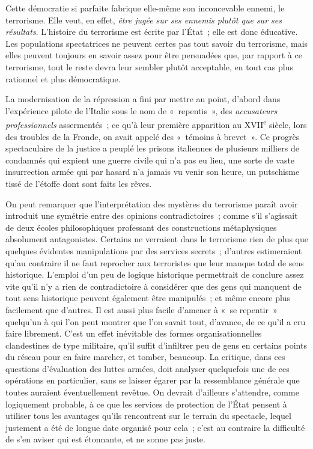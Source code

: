 \documentclass[french,twoside]{book} %
\def\mednobreak{\ifdim\lastskip<\medskipamount
  \removelastskip\nopagebreak\medskip\fi}
\newcommand{\labelblock}[1]{\medbreak{\noindent\color{rubric}\bfseries #1}\par\mednobreak}
\begin{document}
\labelblock{IX}

\noindent Cette démocratie si parfaite fabrique elle-même son inconcevable ennemi, le terrorisme. Elle veut, en effet, \emph{être jugée sur ses ennemis plutôt que sur ses résultats}. L’histoire du terrorisme est écrite par l’État ; elle est donc éducative. Les populations spectatrices ne peuvent certes pas tout savoir du terrorisme, mais elles peuvent toujours en savoir assez pour être persuadées que, par rapport à ce terrorisme, tout le reste devra leur sembler plutôt acceptable, en tout cas plus rationnel et plus démocratique.\par
La modernisation de la répression a fini par mettre au point, d’abord dans l’expérience pilote de l’Italie sous le nom de « repentis », des \emph{accusateurs professionnels} assermentés ; ce qu’à leur première apparition au XVII\textsuperscript{e} siècle, lors des troubles de la Fronde, on avait appelé des « témoins à brevet ». Ce progrès spectaculaire de la justice a peuplé les prisons italiennes de plusieurs milliers de condamnés qui expient une guerre civile qui n’a pas eu lieu, une sorte de vaste insurrection armée qui par hasard n’a jamais vu venir son heure, un putschisme tissé de l’étoffe dont sont faits les rêves.\par
On peut remarquer que l’interprétation des mystères du terrorisme paraît avoir introduit une symétrie entre des opinions contradictoires ; comme s’il s’agissait de deux écoles philosophiques professant des constructions métaphysiques absolument antagonistes. Certains ne verraient dans le terrorisme rien de plus que quelques évidentes manipulations par des services secrets ; d’autres estimeraient qu’au contraire il ne faut reprocher aux terroristes que leur manque total de sens historique. L’emploi d’un peu de logique historique permettrait de conclure assez vite qu’il n’y a rien de contradictoire à considérer que des gens qui manquent de tout sens historique peuvent également être manipulés ; et même encore plus facilement que d’autres. Il est aussi plus facile d’amener à « se repentir » quelqu’un à qui l’on peut montrer que l’on savait tout, d’avance, de ce qu’il a cru faire librement. C’est un effet inévitable des formes organisationnelles clandestines de type militaire, qu’il suffit d’infiltrer peu de gens en certains points du réseau pour en faire marcher, et tomber, beaucoup. La critique, dans ces questions d’évaluation des luttes armées, doit analyser quelquefois une de ces opérations en particulier, sans se laisser égarer par la ressemblance générale que toutes auraient éventuellement revêtue. On devrait d’ailleurs s’attendre, comme logiquement probable, à ce que les services de protection de l’État pensent à utiliser tous les avantages qu’ils rencontrent sur le terrain du spectacle, lequel justement a été de longue date organisé pour cela ; c’est au contraire la difficulté de s’en aviser qui est étonnante, et ne sonne pas juste.\par
\end{document}
